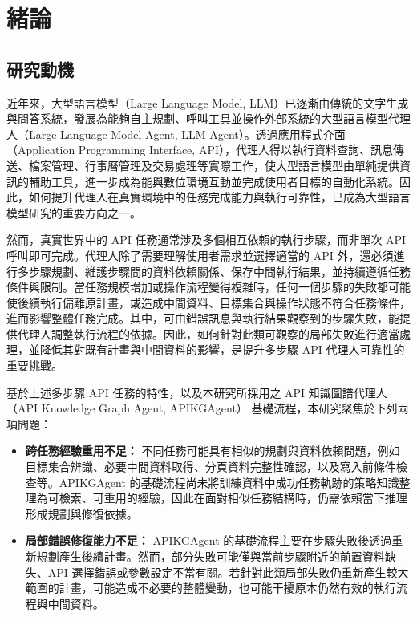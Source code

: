 \chapter{緒論}

\section{研究動機}

近年來，大型語言模型（Large Language Model, LLM）已逐漸由傳統的文字生成與問答系統，發展為能夠自主規劃、呼叫工具並操作外部系統的大型語言模型代理人（Large Language Model Agent, LLM Agent）\cite{wang2024survey}。透過應用程式介面（Application Programming Interface, API），代理人得以執行資料查詢、訊息傳送、檔案管理、行事曆管理及交易處理等實際工作，使大型語言模型由單純提供資訊的輔助工具，進一步成為能與數位環境互動並完成使用者目標的自動化系統。因此，如何提升代理人在真實環境中的任務完成能力與執行可靠性，已成為大型語言模型研究的重要方向之一。

然而，真實世界中的 API 任務通常涉及多個相互依賴的執行步驟，而非單次 API 呼叫即可完成。代理人除了需要理解使用者需求並選擇適當的 API 外，還必須進行多步驟規劃、維護步驟間的資料依賴關係、保存中間執行結果，並持續遵循任務條件與限制。當任務規模增加或操作流程變得複雜時，任何一個步驟的失敗都可能使後續執行偏離原計畫，或造成中間資料、目標集合與操作狀態不符合任務條件，進而影響整體任務完成。其中，可由錯誤訊息與執行結果觀察到的步驟失敗，能提供代理人調整執行流程的依據。因此，如何針對此類可觀察的局部失敗進行適當處理，並降低其對既有計畫與中間資料的影響，是提升多步驟 API 代理人可靠性的重要挑戰。

基於上述多步驟 API 任務的特性，以及本研究所採用之 API 知識圖譜代理人（API Knowledge Graph Agent, APIKGAgent）\cite{wu2025apikgagent} 基礎流程，本研究聚焦於下列兩項問題：

\begin{itemize}
\item \textbf{跨任務經驗重用不足：}
不同任務可能具有相似的規劃與資料依賴問題，例如目標集合辨識、必要中間資料取得、分頁資料完整性確認，以及寫入前條件檢查等。APIKGAgent 的基礎流程尚未將訓練資料中成功任務軌跡的策略知識整理為可檢索、可重用的經驗，因此在面對相似任務結構時，仍需依賴當下推理形成規劃與修復依據。
\item \textbf{局部錯誤修復能力不足：}
APIKGAgent 的基礎流程主要在步驟失敗後透過重新規劃產生後續計畫。然而，部分失敗可能僅與當前步驟附近的前置資料缺失、API 選擇錯誤或參數設定不當有關。若針對此類局部失敗仍重新產生較大範圍的計畫，可能造成不必要的整體變動，也可能干擾原本仍然有效的執行流程與中間資料。
\end{itemize}

